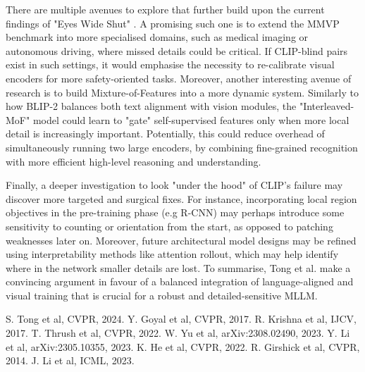 \documentclass[11pt]{article}
\begin{document}
There are multiple avenues to explore that further build upon the current findings of "Eyes Wide Shut" \cite{Tong2024CVPR}. A promising such one is to extend the MMVP benchmark into more specialised domains, such as medical imaging or autonomous driving, where missed details could be critical. If CLIP-blind pairs exist in such settings, it would emphasise the necessity to re-calibrate visual encoders for more safety-oriented tasks.
Moreover, another interesting avenue of research is to build Mixture-of-Features into a more dynamic system. Similarly to how BLIP-2 \cite{Li2023ICML_BLIP2} balances both text alignment with vision modules, the "Interleaved-MoF" model could learn to "gate" self-supervised features only when more local detail is increasingly important. Potentially, this could reduce overhead of simultaneously running two large encoders, by combining fine-grained recognition with more efficient high-level reasoning and understanding.

Finally, a deeper investigation to look "under the hood" of CLIP's failure may discover more targeted and surgical fixes. For instance, incorporating local region objectives in the pre-training phase (e.g R-CNN) may perhaps introduce some sensitivity to counting or orientation from the start, as opposed to patching weaknesses later on.
Moreover, future architectural model designs may be refined using interpretability methods like attention rollout, which may help identify where in the network smaller details are lost.
To summarise, Tong et al. make a convincing argument in favour of a balanced integration of language-aligned and visual training that is crucial for a robust and detailed-sensitive MLLM.

\begin{multicols}{2}
\begin{thebibliography}{9}
    \setlength{\itemsep}{0em}  
    \setlength{\parskip}{0pt}     
     S. Tong et al, CVPR, 2024.
     Y. Goyal et al, CVPR, 2017.
     R. Krishna et al, IJCV, 2017.
     T. Thrush et al, CVPR, 2022.
     W. Yu et al, arXiv:2308.02490, 2023.
     Y. Li et al, arXiv:2305.10355, 2023.
     K. He et al, CVPR, 2022.
     R. Girshick et al, CVPR, 2014.
     J. Li et al, ICML, 2023.
\end{thebibliography}
\end{multicols}
\end{document}
